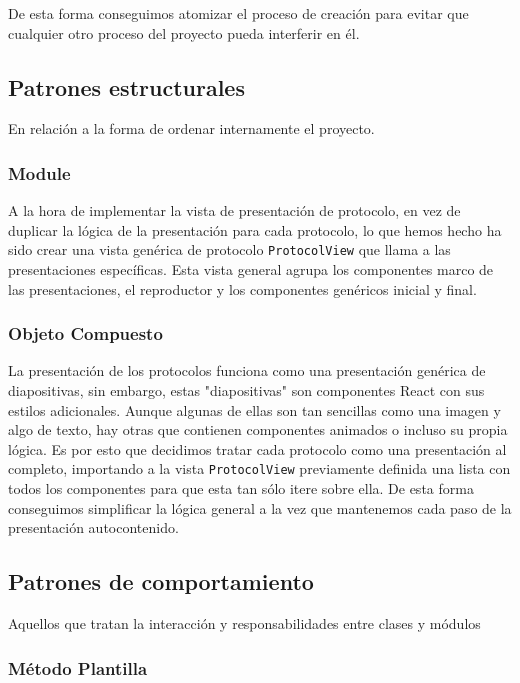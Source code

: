 De esta forma conseguimos atomizar el proceso de creación para evitar que cualquier otro proceso del proyecto pueda interferir en él.


\subsection{Patrones estructurales}

En relación a la forma de ordenar internamente el proyecto.

\subsubsection{Module}

A la hora de implementar la vista de presentación de protocolo, en vez de duplicar la lógica de la presentación para cada protocolo, lo que hemos hecho ha sido crear una vista genérica de protocolo \verb|ProtocolView| que llama a las presentaciones específicas. Esta vista general agrupa los componentes marco de las presentaciones, el reproductor y los componentes genéricos inicial y final.

\subsubsection{Objeto Compuesto}\label{objeto-compuesto}

La presentación de los protocolos funciona como una presentación genérica de diapositivas, sin embargo, estas "diapositivas" son componentes React con sus estilos adicionales. Aunque algunas de ellas son tan sencillas como una imagen y algo de texto, hay otras que contienen componentes animados o incluso su propia lógica. Es por esto que decidimos tratar cada protocolo como una presentación al completo, importando a la vista \verb|ProtocolView| previamente definida una lista con todos los componentes para que esta tan sólo itere sobre ella. De esta forma conseguimos simplificar la lógica general a la vez que mantenemos cada paso de la presentación autocontenido.


\subsection{Patrones de comportamiento}

Aquellos que tratan la interacción y responsabilidades entre clases y módulos

\subsubsection{Método Plantilla}

